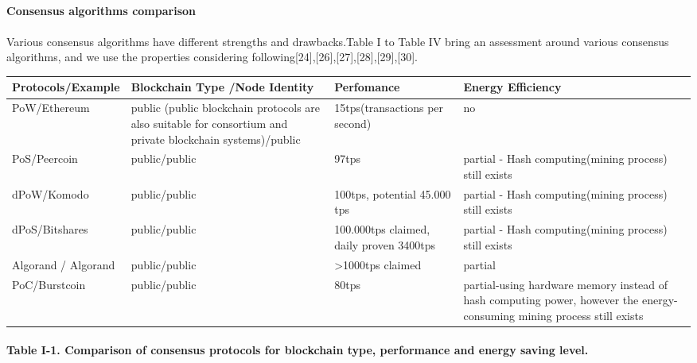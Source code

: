 \documentclass[]{article}
\begin{document}
\begin{CJK*}{UTF8}{gbsn}
\paragraph{Consensus algorithms comparison} 
\paragraph{}
Various consensus algorithms have different strengths and drawbacks.Table I to Table IV bring an assessment around various consensus algorithms, and we use the properties considering following[24],[26],[27],[28],[29],[30]. \newline
\begin{tabular}{p{2cm}p{3cm}p{3cm}p{3cm}}
\hline
Protocols/E\-xample & Blockchain Type \newline /Node Identity & Perfo\-mance & Energy Efficiency \\ \hline
PoW/Ethereum  & public \newline(public blockchain protocols are also suitable for consortium and private blockchain systems)/public  & 15tps(trans\-actions per second) & no \\ \hline
PoS/Peercoin & public/public & 97tps & partial - Hash computing(mining process) still exists \\ \hline
dPoW/Komodo & public/public & 100tps, potential 45.000 tps & partial - Hash computing(mining process) still exists \\ \hline
dPoS/\newline Bitshares & public/public & 100.000tps claimed, daily proven 3400tps & partial - Hash computing(mining process) still exists \\ \hline
Algorand / Algorand & public/public & \textgreater1000tps claimed & partial  \\ \hline
PoC/Burstcoin & public/public & 80tps & partial-using hardware memory instead of hash computing power, however the energy-consuming mining process still exists \\ \hline
\end{tabular}
\paragraph{Table I-1. Comparison of consensus protocols for blockchain type, performance and energy saving level.}


\end{CJK*}
\end{document}
